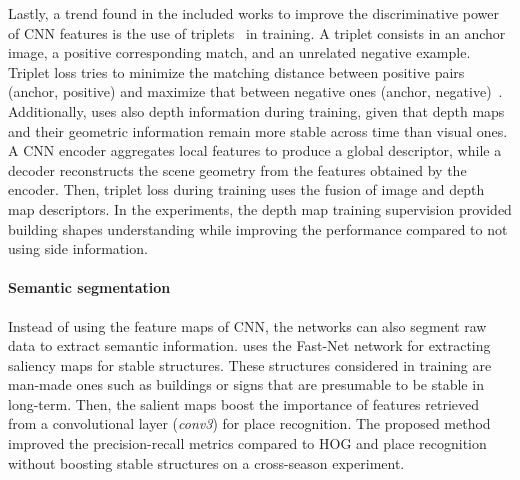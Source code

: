 Lastly, a trend found in the included works to improve the discriminative power of CNN features is the use of triplets~\parencite{martini-et-al:2020:s20216002,liu-et-al:2021:9561126,piasco-et-al:2021:6,sun-et-al:2021:9635886,yin-et-al:2021:3061375,yin-et-al:2021:661199} in training.
A triplet consists in an anchor image, a positive corresponding match, and an unrelated negative example. Triplet loss tries to minimize the matching distance between positive pairs (anchor, positive) and maximize that between negative ones (anchor, negative)~\parencite{sun-et-al:2021:9635886}.
Additionally, \cite{piasco-et-al:2021:6} uses also depth information during training, given that depth maps and their geometric information remain more stable across time than visual ones. A CNN encoder aggregates local features to produce a global descriptor, while a decoder reconstructs the scene geometry from the features obtained by the encoder. Then, triplet loss during training uses the fusion of image and depth map descriptors. In the experiments, the depth map training supervision provided building shapes understanding while improving the performance compared to not using side information.


\paragraph{Semantic segmentation}

Instead of using the feature maps of CNN, the networks can also segment raw data to extract semantic information.
\cite{naseer-et-al:2017:7989305} uses the Fast-Net network for extracting saliency maps for stable structures. These structures considered in training are man-made ones such as buildings or signs that are presumable to be stable in long-term. Then, the salient maps boost the importance of features retrieved from a convolutional layer (\textit{conv3}) for place recognition. The proposed method improved the precision-recall metrics compared to HOG and place recognition without boosting stable structures on a cross-season experiment.

